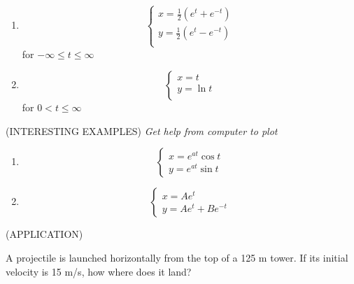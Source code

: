 \documentclass[11pt]{article}
\begin{document}
\begin{enumerate}
    \vspace{1in}

    \pagebreak

  \item{
  \begin{displaymath}
  \left\{ \begin{array}{ll}
    x = \frac12(e^t + e^{-t}) \\[0.15in]
    y = \frac12(e^t - e^{-t}) \\
\end{array} \right.
  \end{displaymath}
     \vspace{0.1in}
  for $-\infty \leq t \leq \infty$
}

        \vspace{3.5in}

        
      \item{
  \begin{displaymath}
  \left\{ \begin{array}{ll}
    x = t \\[0.15in]
    y = \ln{t} \\
\end{array} \right.
  \end{displaymath}
     \vspace{0.1in}
  for $0 < t \leq \infty$
}


\end{enumerate}

\pagebreak

(INTERESTING EXAMPLES)  \emph{Get help from computer to plot}
\begin{enumerate}
        \item{
  \begin{displaymath}
  \left\{ \begin{array}{ll}
    x = e^{at}\cos{t} \\
    y = e^{at}\sin{t}
\end{array} \right.
  \end{displaymath}

}

               \vspace{1in}

             \item{
  \begin{displaymath}
  \left\{ \begin{array}{ll}
    x = Ae^t\\
    y = Ae^t + Be^{-t}
\end{array} \right.
  \end{displaymath}

}

\end{enumerate}

\vspace{1in}

(APPLICATION)

A projectile is launched horizontally from the top of a 125 m tower.  If its initial velocity is 15 m/s, how where does
it land?
\end{document}
